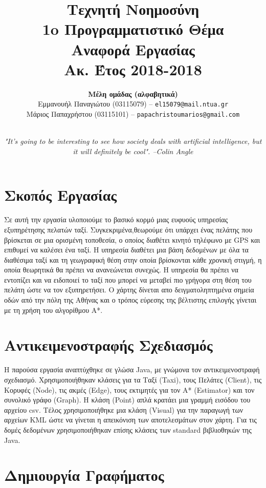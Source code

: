 \documentclass[a4paper,12pt]{article}
\title{ \textbf{Τεχνητή Νοημοσύνη}  \\ 1o Προγραμματιστικό Θέμα \\ Αναφορά Εργασίας \\ \small{Ακ. Έτος 2018-2018}}
\author{\textbf{Μέλη ομάδας (αλφαβητικά)} \\ Εμμανουήλ Παναγιώτου (03115079) -- \texttt{el15079@mail.ntua.gr} \\  Μάριος Παπαχρήστου (03115101) -- \texttt{papachristoumarios@gmail.com} \\ \noindent\rule{0.9\textwidth}{1pt}}
\date{\emph{"It's going to be interesting to see how society deals with artificial intelligence, but it will definitely be cool". --Colin Angle}}
\begin{document}
\maketitle

\section{Σκοπός Εργασίας} 

Σε αυτή την εργασία υλοποιούμε το βασικό κορμό μιας ευφυούς υπηρεσίας εξυπηρέτησης πελατών ταξί. Συγκεκριμένα,θεωρούμε ότι υπάρχει ένας πελάτης που βρίσκεται σε μια ορισμένη τοποθεσία, ο οποίος διαθέτει κινητό τηλέφωνο με GPS και επιθυμεί να καλέσει ένα ταξί. Η υπηρεσία διαθέτει μια βάση δεδομένων με όλα τα διαθέσιμα ταξί και τη γεωγραφική θέση στην
οποία βρίσκονται κάθε χρονική στιγμή, η οποία θεωρητικά θα πρέπει να ανανεώνεται συνεχώς. Η υπηρεσία θα πρέπει να εντοπίζει και να ειδοποιεί το ταξί που μπορεί να μεταβεί πιο γρήγορα στη θέση του πελάτη ώστε να τον εξυπηρετήσει. Ο χάρτης δίνεται απο δειγματοληπτημένα σημεία οδών από την πόλη της Αθήνας και ο τρόπος εύρεσης της βέλτιστης επιλογής γίνεται με τη χρήση του αλγορίθμου Α*. 

\section{Αντικειμενοστραφής Σχεδιασμός} 

Η παρούσα εργασία αναπτύχθηκε σε γλώσα Java, με γνώμονα τον αντικειμενοστραφή σχεδιασμό. Χρησιμοποιήθηκαν κλάσεις για τα Ταξί (Taxi), τους Πελάτες (Client), τις Κορυφές (Node), τις ακμές (Edge), τους εκτιμητές για τον Α* (Estimator) και τον συνολικό γράφο (Graph). Η κλάση (Point) απλά κρατάει μια γραμμή εισόδου του αρχείου csv. Τέλος χρησιμοποιήθηκε μια κλάση (Visual) για την παραγωγή των αρχείων KML ώστε να γίνεται η απεικόνιση των αποτελεσμάτων στον χάρτη. Για τις δομές δεδομένων χρησιμοποιήθηκαν επίσης κλάσεις των standard βιβλιοθηκών της Java. 

\section{Δημιουργία Γραφήματος}
\end{document}
